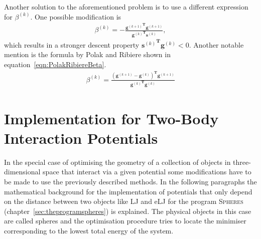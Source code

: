 Another solution to the aforementioned problem is to use a different expression
for $\beta^{(k)}$. One possible modification is
%
\begin{align}
    \beta^{(k)}=-\frac{{\mathbf{g}^{(k+1)}}^\mathbf{T}\mathbf{g}^{(k+1)}}{{\mathbf{g}^{(k)}}^\mathbf{T}\mathbf{s}^{(k)}}\label{eqn:DescentBeta},
\end{align}
%
which results in a stronger descent property
${\mathbf{s}^{(k)}}^\mathbf{T}\mathbf{g}^{(k)} < 0$. Another notable mention is
the formula by Polak and
Ribiere\autocite{Polak_ComputationalMethodsOptimization_1971} shown in
equation~\eqref{eqn:PolakRibiereBeta}.
%
\begin{align}
    \beta^{(k)}=\frac{\left(\mathbf{g}^{(k+1)}-\mathbf{g}^{(k)}\right)^\mathbf{T}\mathbf{g}^{(k+1)}}{{\mathbf{g}^{(k)}}^\mathbf{T}\mathbf{g}^{(k)}}\label{eqn:PolakRibiereBeta}
\end{align}

\section{Implementation for Two-Body Interaction Potentials}
\label{sec:PracticalImplementationForPotentialsDependingOnPairDistances}

In the special case of optimising the geometry of a collection of objects in
three-dimensional space that interact via a given potential some modifications
have to be made to use the previously described methods. In the following
paragraphs the mathematical background for the implementation of potentials
that only depend on the distance between two objects like \ac{LJ} and \ac{eLJ}
for the program \textsc{Spheres} (chapter~\ref{sec:theprogramspheres}) is
explained. The physical objects in this case are called spheres and the
optimisation procedure tries to locate the minimiser corresponding to the
lowest total energy of the system.

